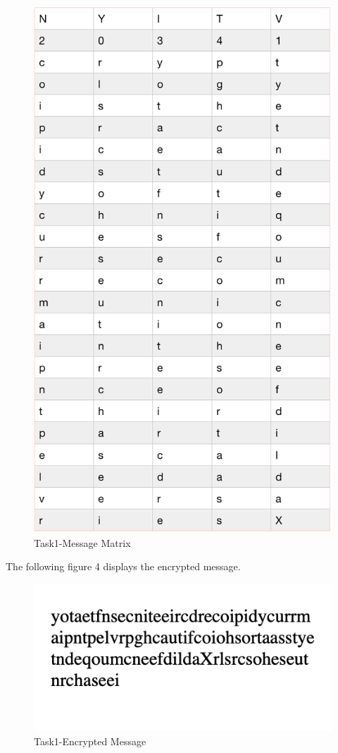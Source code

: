 \documentclass[twoside,twocolumn]{article}
\begin{document}
\begin{figure}[H]
  \centering
  \includegraphics[scale=0.45]{./Graphs/Figure1.2.png}
  \caption{Task1-Message Matrix}
  \label{fig:testfig1}
\end{figure}


The following figure 4 displays the encrypted message.

\begin{figure}[H]
  \centering
  \includegraphics[scale=0.75]{./Graphs/Figure1.4.png}
  \caption{Task1-Encrypted Message}
  \label{fig:testfig1}
\end{figure}
\end{document}
